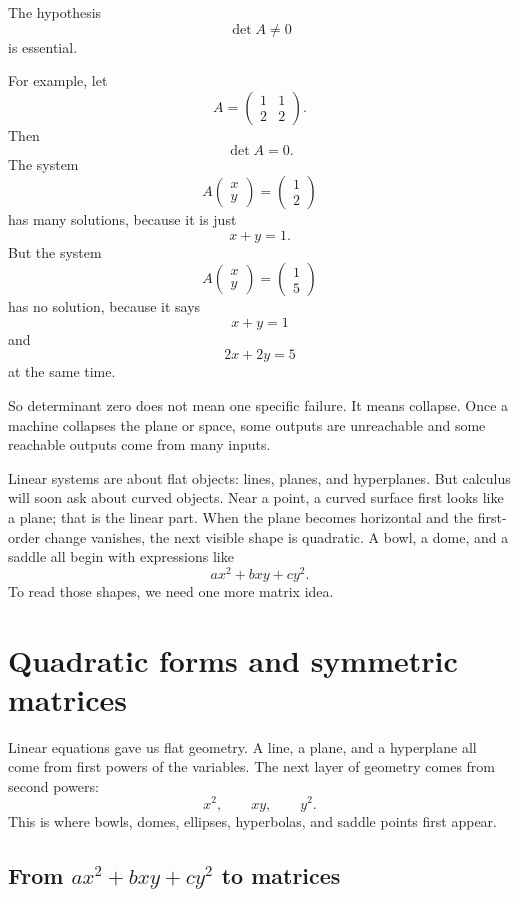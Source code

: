 The hypothesis
\[
    \det A\neq0
\]
is essential.

For example, let
\[
    A=
    \begin{pmatrix}
        1&1\\
        2&2
    \end{pmatrix}.
\]
Then
\[
    \det A=0.
\]
The system
\[
    A
    \begin{pmatrix}
        x\\y
    \end{pmatrix}
    =
    \begin{pmatrix}
        1\\2
    \end{pmatrix}
\]
has many solutions, because it is just
\[
    x+y=1.
\]
But the system
\[
    A
    \begin{pmatrix}
        x\\y
    \end{pmatrix}
    =
    \begin{pmatrix}
        1\\5
    \end{pmatrix}
\]
has no solution, because it says
\[
    x+y=1
\]
and
\[
    2x+2y=5
\]
at the same time.

So determinant zero does not mean one specific failure.  It means collapse.  Once a
machine collapses the plane or space, some outputs are unreachable and some reachable
outputs come from many inputs.

Linear systems are about flat objects: lines, planes, and hyperplanes.  But calculus will
soon ask about curved objects.  Near a point, a curved surface first looks like a plane;
that is the linear part.  When the plane becomes horizontal and the first-order change
vanishes, the next visible shape is quadratic.  A bowl, a dome, and a saddle all begin
with expressions like
\[
    ax^2+bxy+cy^2.
\]
To read those shapes, we need one more matrix idea.

\section{Quadratic forms and symmetric matrices}
\label{sec:3.6}

Linear equations gave us flat geometry.  A line, a plane, and a hyperplane all come from
first powers of the variables.  The next layer of geometry comes from second powers:
\[
    x^2,\qquad xy,\qquad y^2.
\]
This is where bowls, domes, ellipses, hyperbolas, and saddle points first appear.

\subsection{From \(ax^2+bxy+cy^2\) to matrices}

